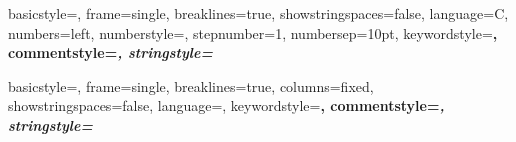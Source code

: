 \usepackage[a4paper, margin=2cm]{geometry}
\usepackage{graphicx, float}
\usepackage{fontspec}
\usepackage{listings}
\usepackage{xcolor}
\usepackage{fancyhdr}
\usepackage[onehalfspacing]{setspace}
\usepackage[skip=6pt]{parskip}
\usepackage{microtype}
\usepackage{fancyvrb}
\usepackage{minted}
\usepackage[
  colorlinks=true,
  linkcolor=black,
  pdfauthor={Raghav Chauhan},
  pdftitle={Huffman Compression}
] {hyperref}

\setmainfont{TeX Gyre Pagella}
\setmainfont{TeX Gyre Adventor}
\setmonofont{Iosevka Fixed}


 {
basicstyle=\ttfamily\footnotesize\singlespacing,
frame=single,
breaklines=true,
showstringspaces=false,
language=C,
numbers=left,
numberstyle=\scriptsize\ttfamily,
stepnumber=1,
numbersep=10pt,
keywordstyle=\color{codeblue}\bfseries,
commentstyle=\color{codegreen}\itshape,
stringstyle=\color{codepurple}
}

 {
basicstyle=\ttfamily\singlespacing,
frame=single,
breaklines=true,
columns=fixed,
showstringspaces=false,
language={},
keywordstyle=\color{black}\bfseries,
commentstyle=\color{black}\itshape,
stringstyle=\color{black}
}

\lstset{style=code}

\setlength{\headheight}{15pt}
\pagestyle{fancy}
\fancyhf{}
\cfoot{\ttfamily{\thepage}}



\renewcommand{\theFancyVerbLine}{
    \ttfamily\scriptsize\arabic{FancyVerbLine}
}

